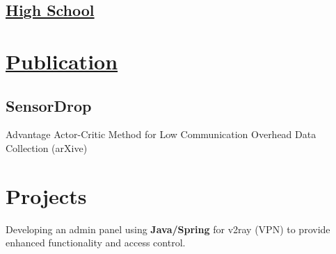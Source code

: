 \documentclass[]{plushcv}
\begin{document}
\begin{minipage}[t]{0.25\textwidth}
\sectionsep
\subsection{\href{https://en.wikipedia.org/wiki/National_Organization_for_Development_of_Exceptional_Talents}{High School}}
\sectionsep

\section{\href{https://scholar.google.com/citations?view_op=view_citation&hl=en&user=PEj2AqMAAAAJ&citation_for_view=PEj2AqMAAAAJ:aqlVkmm33-oC}{Publication}}
\subsection{SensorDrop}
 Advantage Actor-Critic Method for Low Communication Overhead Data Collection (arXive)
 
\section{Projects}
Developing an admin panel using \textbf{Java/Spring} for v2ray (VPN) to provide enhanced functionality and access control.


\end{minipage} 
\end{document}
